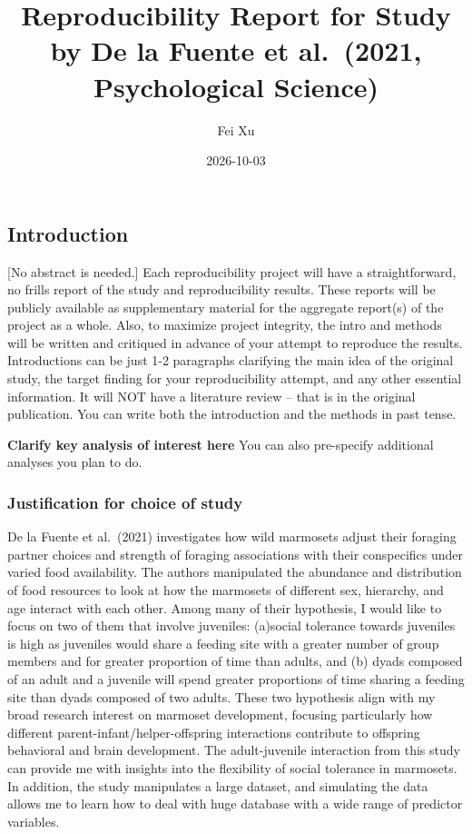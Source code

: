 \documentclass[
  letterpaper,
  DIV=11,
  numbers=noendperiod]{scrartcl}
\title{Reproducibility Report for Study by De la Fuente et al.~(2021,
Psychological Science)}
\author{Fei Xu}
\date{2026-10-03}
\renewcommand*\contentsname{Table of contents}
\newcommand\contentsname{Table of contents}
\begin{document}
\maketitle

\renewcommand*\contentsname{Table of contents}
{
\setcounter{tocdepth}{3}
\tableofcontents
}

\subsection{Introduction}\label{introduction}

{[}No abstract is needed.{]} Each reproducibility project will have a
straightforward, no frills report of the study and reproducibility
results. These reports will be publicly available as supplementary
material for the aggregate report(s) of the project as a whole. Also, to
maximize project integrity, the intro and methods will be written and
critiqued in advance of your attempt to reproduce the results.
Introductions can be just 1-2 paragraphs clarifying the main idea of the
original study, the target finding for your reproducibility attempt, and
any other essential information. It will NOT have a literature review --
that is in the original publication. You can write both the introduction
and the methods in past tense.

\textbf{Clarify key analysis of interest here} You can also pre-specify
additional analyses you plan to do.

\subsubsection{Justification for choice of
study}\label{justification-for-choice-of-study}

De la Fuente et al.~(2021) investigates how wild marmosets adjust their
foraging partner choices and strength of foraging associations with
their conspecifics under varied food availability. The authors
manipulated the abundance and distribution of food resources to look at
how the marmosets of different sex, hierarchy, and age interact with
each other. Among many of their hypothesis, I would like to focus on two
of them that involve juveniles: (a)social tolerance towards juveniles is
high as juveniles would share a feeding site with a greater number of
group members and for greater proportion of time than adults, and (b)
dyads composed of an adult and a juvenile will spend greater proportions
of time sharing a feeding site than dyads composed of two adults. These
two hypothesis align with my broad research interest on marmoset
development, focusing particularly how different
parent-infant/helper-offspring interactions contribute to offspring
behavioral and brain development. The adult-juvenile interaction from
this study can provide me with insights into the flexibility of social
tolerance in marmosets. In addition, the study manipulates a large
dataset, and simulating the data allows me to learn how to deal with
huge database with a wide range of predictor variables.
\end{document}
